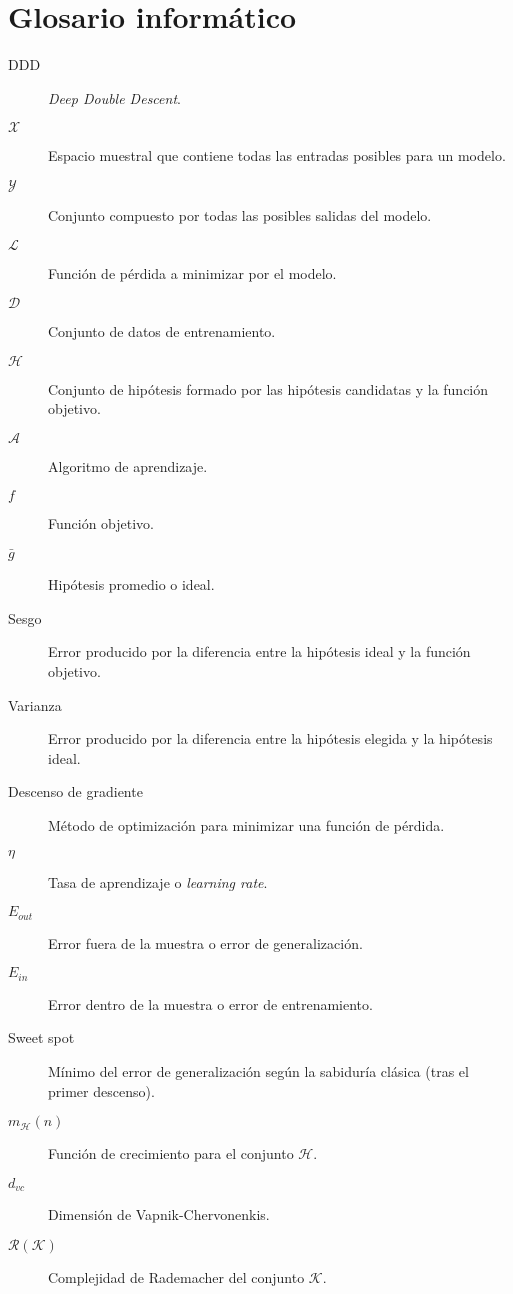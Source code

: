 
\chapter*{Glosario informático}

\begin{description} 
  \item[DDD] \textit{Deep Double Descent}.
  \item[$\mathcal{X}$] Espacio muestral que contiene todas las entradas posibles para un modelo.
  \item[$\mathcal{Y}$] Conjunto compuesto por todas las posibles salidas del modelo.
  \item[$\mathcal{L}$] Función de pérdida a minimizar por el modelo.
  \item[$\mathcal{D}$] Conjunto de datos de entrenamiento.
  \item[$\mathcal{H}$] Conjunto de hipótesis formado por las hipótesis candidatas y la función objetivo.
  \item[$\mathcal{A}$] Algoritmo de aprendizaje. 
  \item[$f$] Función objetivo. 
  \item[$\bar{g}$] Hipótesis promedio o ideal.
  \item[Sesgo] Error producido por la diferencia entre la hipótesis ideal y la función objetivo.
  \item[Varianza] Error producido por la diferencia entre la hipótesis elegida y la hipótesis ideal.
  \item[Descenso de gradiente] Método de optimización para minimizar una función de pérdida.
  \item[$\eta$] Tasa de aprendizaje o \textit{learning rate}.
  \item[$E_{out}$] Error fuera de la muestra o error de generalización. 
  \item[$E_{in}$] Error dentro de la muestra o error de entrenamiento.
  \item[Sweet spot] Mínimo del error de generalización según la sabiduría clásica (tras el primer descenso).
  \item[$m_{\mathcal{H}}(n)$] Función de crecimiento para el conjunto $\mathcal{H}$.
  \item[$d_{vc}$] Dimensión de Vapnik-Chervonenkis.
  \item[$\mathcal{R}(\mathcal{K})$] Complejidad de Rademacher del conjunto $\mathcal{K}$.

\end{description}
